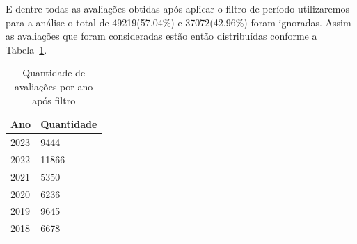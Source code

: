E dentre todas as avaliações obtidas após aplicar o filtro de período utilizaremos para a análise o total de 49219(57.04\%) e 37072(42.96\%) foram ignoradas. Assim as avaliações que foram consideradas estão então distribuídas conforme a Tabela~\ref{table:distribuicao_review_per_year}.

\begin{table}[h]
	\centering
	\begin{tabular}{|l|l|}
		\hline
		\textbf{Ano} & \textbf{Quantidade} \\\hline
		2023         & 9444                \\
		2022         & 11866               \\
		2021         & 5350                \\
		2020         & 6236                \\
		2019         & 9645                \\
		2018         & 6678                \\
		\hline
	\end{tabular}
	\caption{Quantidade de avaliações por ano após filtro}
	\label{table:distribuicao_review_per_year}
\end{table}


